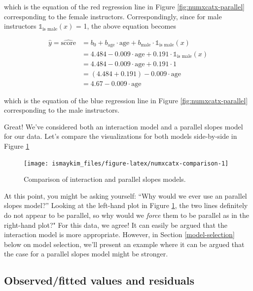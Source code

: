 \documentclass[12pt, krantz2,]{krantz}
\begin{document}
which is the equation of the red regression line in Figure \ref{fig:numxcatx-parallel} corresponding to the female instructors. Correspondingly, since for male instructors \(\mathbb{1}_{\mbox{is male}}(x)\) = 1, the above equation becomes

\[
\begin{aligned}
\widehat{y} = \widehat{\text{score}} &= b_0 + b_{\mbox{age}} \cdot \mbox{age} + b_{\mbox{male}} \cdot \mathbb{1}_{\mbox{is male}}(x)\\
&= 4.484 -0.009 \cdot \mbox{age} + 0.191 \cdot \mathbb{1}_{\mbox{is male}}(x)\\
&= 4.484 -0.009 \cdot \mbox{age} + 0.191 \cdot 1\\
&= (4.484 + 0.191) - 0.009 \cdot \mbox{age}\\
&= 4.67 -0.009 \cdot \mbox{age}
\end{aligned}
\]

which is the equation of the blue regression line in Figure \ref{fig:numxcatx-parallel} corresponding to the male instructors.

Great! We've considered both an interaction model and a parallel slopes model for our data. Let's compare the visualizations for both models side-by-side in Figure \ref{fig:numxcatx-comparison}

\begin{figure}

{\centering \texttt{[image: ismaykim\_files/figure-latex/numxcatx-comparison-1]} 

}

\caption{Comparison of interaction and parallel slopes models.}\label{fig:numxcatx-comparison}
\end{figure}

At this point, you might be asking yourself: ``Why would we ever use an parallel slopes model?'' Looking at the left-hand plot in Figure \ref{fig:numxcatx-comparison}, the two lines definitely do not appear to be parallel, so why would we \emph{force} them to be parallel as in the right-hand plot?" For this data, we agree! It can easily be argued that the interaction model is more appropriate. However, in Section \ref{model-selection} below on model selection, we'll present an example where it can be argued that the case for a parallel slopes model might be stronger.

\hypertarget{model4points}{%
\subsection{Observed/fitted values and residuals}\label{model4points}}
\end{document}
